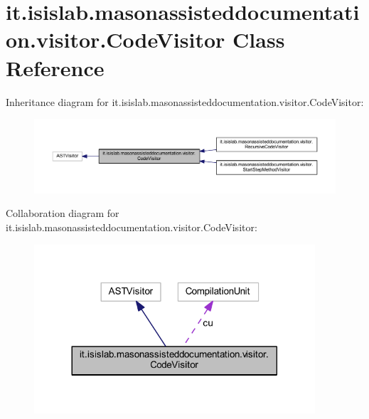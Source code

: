 \hypertarget{classit_1_1isislab_1_1masonassisteddocumentation_1_1visitor_1_1_code_visitor}{\section{it.\-isislab.\-masonassisteddocumentation.\-visitor.\-Code\-Visitor Class Reference}
\label{classit_1_1isislab_1_1masonassisteddocumentation_1_1visitor_1_1_code_visitor}
}


Inheritance diagram for it.\-isislab.\-masonassisteddocumentation.\-visitor.\-Code\-Visitor\-:\nopagebreak
\begin{figure}[H]
\begin{center}
\leavevmode
\includegraphics[width=350pt]{classit_1_1isislab_1_1masonassisteddocumentation_1_1visitor_1_1_code_visitor__inherit__graph}
\end{center}
\end{figure}


Collaboration diagram for it.\-isislab.\-masonassisteddocumentation.\-visitor.\-Code\-Visitor\-:\nopagebreak
\begin{figure}[H]
\begin{center}
\leavevmode
\includegraphics[width=296pt]{classit_1_1isislab_1_1masonassisteddocumentation_1_1visitor_1_1_code_visitor__coll__graph}
\end{center}
\end{figure}
